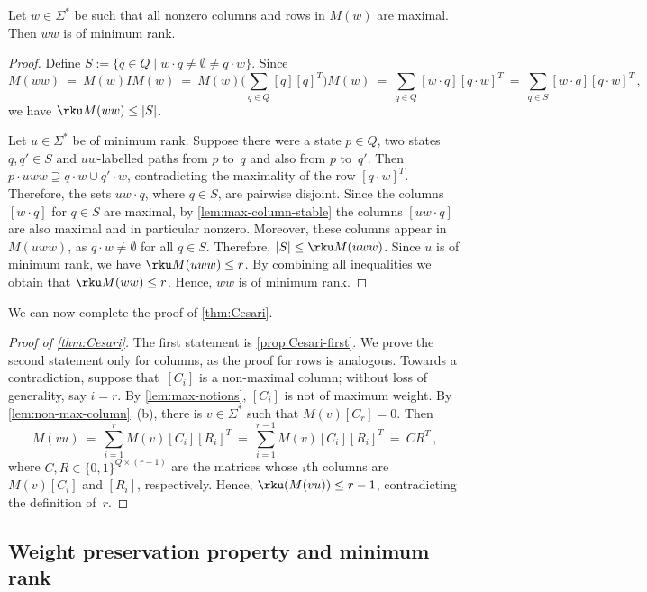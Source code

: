 \begin{lem} \label{lem:all-max-column}
Let $w \in \Sigma^*$ be such that all nonzero columns and rows in $M(w)$ are maximal. Then %
$w w$ is of minimum rank.
\end{lem}
\begin{proof}
Define $S := \{q \in Q \mid w \cdot q \ne \emptyset \ne q \cdot w\}$.
Since
\[
M(w w) \ = \ M(w) I M(w) \ = \ M(w) \big( \sum_{q \in Q} [q] [q]^T \big) M(w) \ = \ \sum_{q \in Q} [w \cdot q] [q \cdot w]^T \ = \ \sum_{q \in S} [w \cdot q] [q \cdot w]^T\,,
\]
we have $\rku M(w w) \le |S|$. %

\noindent
Let $u \in \Sigma^*$ be of minimum rank.
Suppose there were a state $p \in Q$, two states $q, q' \in S$ and $u w$-labelled paths from $p$ to~$q$ and also from $p$ to~$q'$.
Then $p \cdot u w w \supseteq q \cdot w \cup q' \cdot w$, contradicting the maximality of the row $[q \cdot w]^T$.
Therefore, the sets $u w \cdot q$, where $q \in S$, are pairwise disjoint.
Since the columns $[w \cdot q]$ for $q \in S$ are maximal, by \autoref{lem:max-column-stable} the columns $[u w \cdot q]$ are also maximal and in particular nonzero.
Moreover, these columns appear in $M(u w w)$, as $q \cdot w \ne \emptyset$ for all $q \in S$.
Therefore, $|S| \le \rku M(u w w)$.
Since $u$ is of minimum rank, we have $\rku M(u w w) \le r$.
By combining all inequalities we obtain that $\rku M(w w) \le r$.
Hence, $w w$ is of minimum rank.
\end{proof}

\noindent
We can now complete the proof of \autoref{thm:Cesari}.
\begin{proof}[Proof of \autoref{thm:Cesari}]
The first statement is \autoref{prop:Cesari-first}.
We prove the second statement only for columns, as the proof for rows is analogous.
Towards a contradiction, suppose that~$[C_i]$ is a non-maximal column; without loss of generality, say $i=r$.
By \autoref{lem:max-notions}, $[C_i]$ is not of maximum weight.
By \autoref{lem:non-max-column}~(b), there is $v \in \Sigma^*$ such that $M(v) [C_r] = 0$.
Then 
\[
 M(v u) \ = \ \sum_{i=1}^r M(v) [C_i] [R_i]^T \ = \ \sum_{i=1}^{r-1} M(v) [C_i] [R_i]^T \ = \ C R^T\,,
\]
where 
$C, R \in \{0,1\}^{Q \times (r-1)}$ are the matrices whose $i$th columns are $M(v) [C_i]$ and $[R_i]$, respectively.
Hence, $\rku(M(v u)) \le r-1$, contradicting the definition of~$r$.
\end{proof}


\subsection{Weight preservation property and minimum rank}\label{subsec:weight-preserv}

